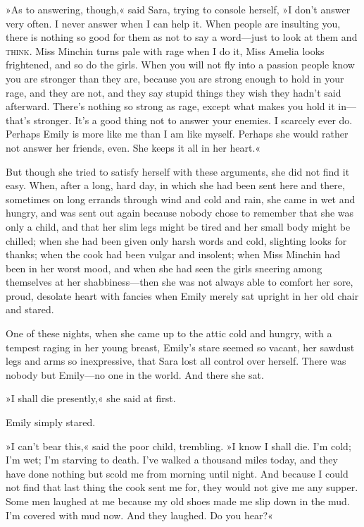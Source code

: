 »As to answering, though,« said Sara, trying to console herself, »I don't answer very often. I never answer when I can help it. When people are insulting you, there is nothing so good for them as not to say a word—just to look at them and \textsc{think}. Miss Minchin turns pale with rage when I do it, Miss Amelia looks frightened, and so do the girls. When you will not fly into a passion people know you are stronger than they are, because you are strong enough to hold in your rage, and they are not, and they say stupid things they wish they hadn't said afterward. There's nothing so strong as rage, except what makes you hold it in—that's stronger. It's a good thing not to answer your enemies. I scarcely ever do. Perhaps Emily is more like me than I am like myself. Perhaps she would rather not answer her friends, even. She keeps it all in her heart.«

But though she tried to satisfy herself with these arguments, she did not find it easy. When, after a long, hard day, in which she had been sent here and there, sometimes on long errands through wind and cold and rain, she came in wet and hungry, and was sent out again because nobody chose to remember that she was only a child, and that her slim legs might be tired and her small body might be chilled; when she had been given only harsh words and cold, slighting looks for thanks; when the cook had been vulgar and insolent; when Miss Minchin had been in her worst mood, and when she had seen the girls sneering among themselves at her shabbiness—then she was not always able to comfort her sore, proud, desolate heart with fancies when Emily merely sat upright in her old chair and stared.

One of these nights, when she came up to the attic cold and hungry, with a tempest raging in her young breast, Emily's stare seemed so vacant, her sawdust legs and arms so inexpressive, that Sara lost all control over herself. There was nobody but Emily—no one in the world. And there she sat.

»I shall die presently,« she said at first.

Emily simply stared.

»I can't bear this,« said the poor child, trembling. »I know I shall die. I'm cold; I'm wet; I'm starving to death. I've walked a thousand miles today, and they have done nothing but scold me from morning until night. And because I could not find that last thing the cook sent me for, they would not give me any supper. Some men laughed at me because my old shoes made me slip down in the mud. I'm covered with mud now. And they laughed. Do you hear?«

